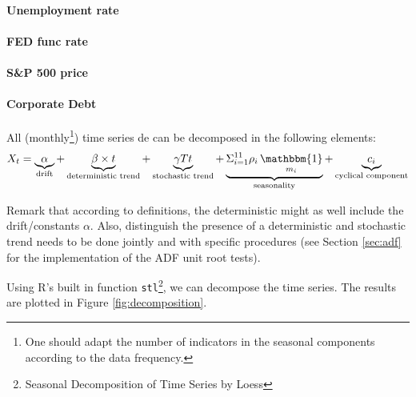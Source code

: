 \documentclass[hidelinks,12pts]{article}
\DeclareMathOperator{\1}{\mathbbm{1}}
\begin{document}
\paragraph{Unemployment rate}

\paragraph{FED func rate}

\paragraph{S\&P 500 price}

\paragraph{Corporate Debt }

All (monthly\footnote{One should adapt the number of indicators in the seasonal components according to the data frequency.}) time series de can be decomposed in the following elements: 
    \begin{equation*}
        X_t =  \underbrace{\alpha}_{\text{drift}} + \underbrace{\beta \times t}_{\text{deterministic trend}} + \underbrace{\gamma Tt}_{\text{stochastic trend}} + \underbrace{\Sigma_{i=1}^{11} \rho_i \1_{m_i}}_{\text{seasonality}} + \underbrace{c_i}_{\text{cyclical component}}
    \end{equation*}

Remark that according to definitions, the deterministic might as well include the drift/constants $\alpha$.
Also, distinguish the presence of a deterministic and stochastic trend needs to be done jointly and with specific procedures (see Section \ref{sec:adf} for the implementation of the ADF unit root tests). 

Using R's built in function \texttt{stl}\footnote{Seasonal Decomposition of Time Series by Loess}, we can decompose the time series. 
The results are plotted in Figure \ref{fig:decomposition}.
\end{document}
